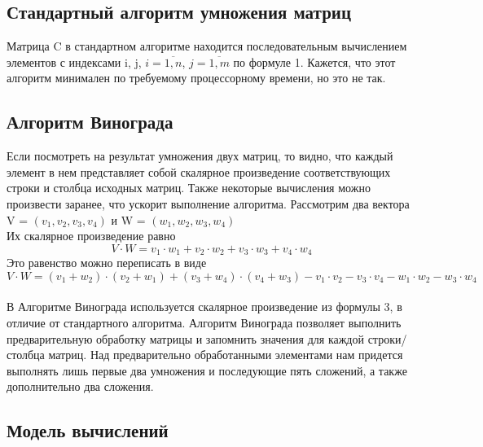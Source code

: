 \documentclass[a4paper, 14pt]{article}
\begin{document}
		\subsection{Стандартный алгоритм умножения матриц}
		
		Матрица C в стандартном алгоритме находится последовательным вычислением элементов с индексами i, j, $i = \overline{1,n}$, $j = \overline{1,m}$ по формуле 1. Кажется, что этот алгоритм минимален по требуемому процессорному времени, но это не так.
		
		\subsection{Алгоритм Винограда}
		
		Если посмотреть на результат умножения двух матриц, то видно,
		что каждый элемент в нем представляет собой скалярное произведение
		соответствующих строки и столбца исходных матриц. Также некоторые вычисления можно произвести заранее, что ускорит выполнение алгоритма.
		Рассмотрим два вектора V = $(v_{1}, v_{2}, v_{3}, v_{4})$ и W = $(w_{1}, w_{2}, w_{3}, w_{4})$\\
		    Их скалярное произведение равно\\
		    \begin{equation}
 V \cdot W=v_1 \cdot w_1 + v_2 \cdot w_2 + v_3 \cdot w_3 + v_4 \cdot w_4 
		    \end{equation}
         Это равенство можно переписать в виде\\
         \begin{equation}
V \cdot W=(v_1 + w_2) \cdot (v_2 + w_1) + (v_3 + w_4) \cdot (v_4 + w_3) - v_1 \cdot v_2 - v_3 \cdot v_4 - w_1 \cdot w_2 - w_3 \cdot w_4
         \end{equation}\\
        В Алгоритме Винограда используется скалярное произведение из формулы 3, в отличие от стандартного алгоритма. Алгоритм Винограда позволяет выполнить предварительную обработку матрицы и запомнить значения для каждой строки/столбца матриц.
Над предварительно обработанными элементами нам придется выполнять лишь первые два умножения и последующие пять сложений, а также
дополнительно два сложения.\\
		
		\subsection{Модель вычислений}
		
\end{document}
